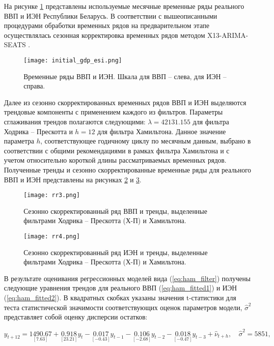 \documentclass[a4paper,14pt]{extreport}
\begin{document}
	На рисунке \ref{fig:inital_gdp_esi} представлены используемые месячные временные ряды реального ВВП и ИЭН Республики Беларусь. В соответствии с вышеописанными процедурами обработки временных рядов на предварительном этапе осуществлялась сезонная корректировка временных рядов методом X13-ARIMA-SEATS \cite{seasonalManual}.
	
	
	\begin{figure}
		\texttt{[image: initial\_gdp\_esi.png]}
		\caption{
			Временные ряды ВВП и ИЭН. 
			Шкала для ВВП -- слева, для ИЭН -- справа. 
		}
		\label{fig:inital_gdp_esi}
	\end{figure} 

	Далее из сезонно скорректированных временных рядов ВВП и ИЭН выделяются трендовые компоненты с применением каждого из фильтров. Параметры сглаживания трендов полагаются следующими: $\lambda=42131.155$ для фильтра Ходрика -- Прескотта \cite{esiMakingAlt} и $h=12$ для фильтра Хамильтона. Данное значение параметра $h$, соответствующее годичному циклу по месячным данным, выбрано в соответствии с общими рекомендациями в рамках фильтра Хамильтона и с учетом относительно короткой длины рассматриваемых временных рядов. Полученные тренды и сезонно скорректированные временные ряды для реального ВВП и ИЭН представлены на рисунках \ref{fig:rr3} и \ref{fig:rr4}.
	
	\begin{figure}
		\texttt{[image: rr3.png]}
		\caption{
			Сезонно скорректированный ряд ВВП и тренды, 
			выделенные фильтрами Ходрика -- Прескотта (Х-П) и Хамильтона. 
		}
		\label{fig:rr3}
	\end{figure}	

	\begin{figure}
		\texttt{[image: rr4.png]}
		\caption{
			Сезонно скорректированный ряд ИЭН и тренды, 
			выделенные фильтрами Ходрика -- Прескотта (Х-П) и Хамильтона.
		}
		\label{fig:rr4}
	\end{figure}	

	В результате оценивания регрессионных моделей вида (\ref{eq:ham_filter}) получены следующие уравнения трендов для реального ВВП (\ref{eq:ham_fitted1}) и ИЭН (\ref{eq:ham_fitted2}). В квадратных скобках указаны значения t-статистики для теста статистической значимости соответствующих оценок параметров модели, $\hat{\sigma}^2$ представляет собой оценку дисперсии остатков:
	
	\begin{equation}
		y_{t+12} = \underset{[7.63]}{1490.67} 
		+ \underset{[23.21]}{0.918} y_{t}
		- \underset{[-0.43]}{0.017} y_{t-1}
		- \underset{[-2.68]}{0.106} y_{t-2}
		- \underset{[-0.47]}{0.018} y_{t-3}
		+ \hat{\nu}_{t+h}, \quad \hat{\sigma}^2=5851 ,
		\label{eq:ham_fitted1}
	\end{equation}
	
\end{document}
